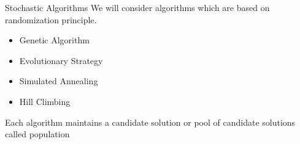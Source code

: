 \documentclass{beamer}
\begin{document}
\begin{frame}[t]{Stochastic Algorithms}
    We will consider algorithms which are based on randomization principle.
    \vspace{10px}
\begin{itemize} \itemsep1.5em
        \item Genetic Algorithm
        \item Evolutionary Strategy
        \item Simulated Annealing
        \item Hill Climbing
    \end{itemize}
    \vspace{5mm}
    Each algorithm maintains a candidate solution or pool of candidate solutions called population
\end{frame}
\end{document}
